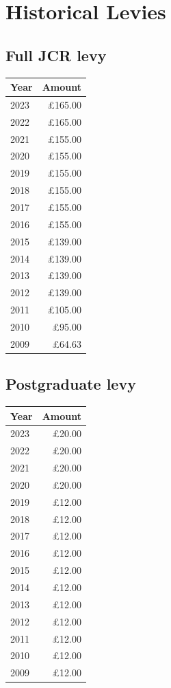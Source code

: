 \documentclass[12pt]{article}
\begin{document}
\section{Historical Levies}
\subsection{Full JCR levy}
\begin{center}
\begin{tabular}{|l|r|}\hline
    \textbf{Year} & \textbf{Amount} \\\hline
    2023 & £165.00 \\
    2022 & £165.00 \\
    2021 & £155.00 \\
    2020 & £155.00 \\
    2019 & £155.00 \\
    2018 & £155.00 \\
    2017 & £155.00 \\
    2016 & £155.00 \\
    2015 & £139.00 \\
    2014 & £139.00 \\
    2013 & £139.00 \\
    2012 & £139.00 \\
    2011 & £105.00 \\
    2010 &  £95.00 \\
    2009 &  £64.63 \\
    \hline
\end{tabular}
\end{center}

\subsection{Postgraduate levy}
\begin{center}
\begin{tabular}{|l|r|}\hline
    \textbf{Year} & \textbf{Amount} \\\hline
    2023 & £20.00 \\
    2022 & £20.00 \\
    2021 & £20.00 \\
    2020 & £20.00 \\
    2019 & £12.00 \\
    2018 & £12.00 \\
    2017 & £12.00 \\
    2016 & £12.00 \\
    2015 & £12.00 \\
    2014 & £12.00 \\
    2013 & £12.00 \\
    2012 & £12.00 \\
    2011 & £12.00 \\
    2010 & £12.00 \\
    2009 & £12.00 \\
    \hline
\end{tabular}
\end{center}
\end{document}
